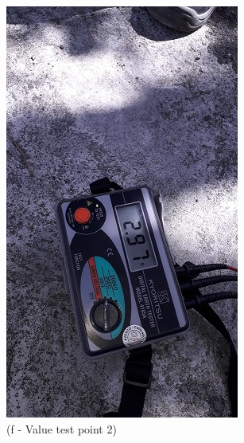 \begin{figure}
\begin{minipage}[b]{0.22\linewidth}
	\includegraphics[width=\textwidth]{figures/R1P_grounding/reading2.jpg}
	\caption*{(f - Value test point 2)}
\end{minipage}
\hspace{0.03cm}
\begin{minipage}[b]{0.22\linewidth}
	\centering

\end{minipage}
\end{figure}
